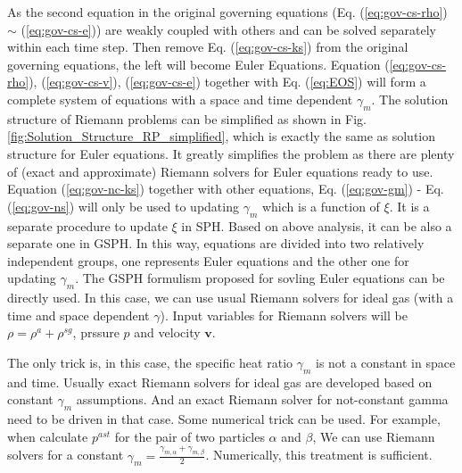 As the second equation in the original governing equations (Eq. (\ref{eq:gov-cs-rho}) $\sim$ (\ref{eq:gov-cs-e})) are weakly coupled with others and can be solved separately within each time step. Then remove Eq. (\ref{eq:gov-cs-ks}) from the original governing equations, the left will become Euler Equations. Equation (\ref{eq:gov-cs-rho}), (\ref{eq:gov-cs-v}), (\ref{eq:gov-cs-e}) together with Eq. (\ref{eq:EOS}) will form a complete system of equations with a space and time dependent $\gamma_{m}$. The solution structure of Riemann problems can be simplified as shown in Fig. \ref{fig:Solution_Structure_RP_simplified}, which is exactly the same as solution structure for Euler equations. It greatly simplifies the problem as there are plenty of (exact and approximate) Riemann solvers for Euler equations ready to use. Equation (\ref{eq:gov-nc-ks}) together with other equations, Eq. (\ref{eq:gov-gm}) - Eq. (\ref{eq:gov-ns}) will only be used to updating $\gamma_{m}$ which is a function of $\xi$. It is a separate procedure to update $\xi$ in SPH. Based on above analysis, it can be also a separate one in GSPH. In this way, equations are divided into two relatively independent groups, one represents Euler equations and the other one for updating $\gamma_{m}$.
The GSPH formulism \citep{inutsuka2002reformulation} proposed for sovling Euler equations can be directly used. In this case, we can use usual Riemann solvers for ideal gas (with a time and space dependent $\gamma$). Input variables for Riemann solvers will be $\rho=\rho^a + \rho^{sg}$, prssure $p$ and velocity $\textbf{v}$.
 
The only trick is, in this case, the specific heat ratio $\gamma_{m}$ is not a constant in space and time. Usually exact Riemann solvers for ideal gas are developed based on constant $\gamma_{m}$ assumptions. And an exact Riemann solver for not-constant gamma need to be driven in that case. Some numerical trick can be used. For example, when calculate $p^{ast}$ for the pair of two particles $\alpha$ and $\beta$, We can use Riemann solvers for a constant $\gamma_{m}=\frac{\gamma_{m,\alpha}+\gamma_{m,\beta}}{2}$.
Numerically, this treatment is sufficient. 